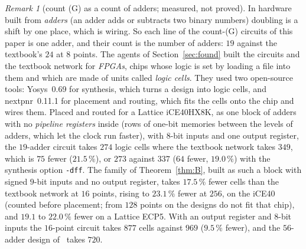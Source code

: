 \documentclass[10pt]{article}
\theoremstyle{remark}
\newtheorem{remark}[proposition]{Remark}
\newcommand{\cntG}{\textup{(G)}}
\begin{document}
\begin{remark}[count \cntG{} as a count of adders; measured, not proved]\label{rem:hardware}
In hardware built from \emph{adders} (an adder adds or subtracts two binary numbers) doubling is a shift by
one place, which is wiring. So each line of the count-\cntG{} circuits of this paper is one adder, and
their count is the number of adders: $19$ against the textbook's $24$ at $8$ points. The agents of
Section~\ref{sec:found} built the circuits and the textbook network for \emph{FPGAs}, chips whose logic is
set by loading a file into them and which are made of units called \emph{logic cells}. They used two
open-source tools: Yosys~0.69 for synthesis, which turns a design into logic cells, and nextpnr~0.11.1 for
placement and routing, which fits the cells onto the chip and wires them. Placed and routed for a Lattice
iCE40HX8K, as one block of adders with no \emph{pipeline registers} inside (rows of one-bit memories
between the levels of adders, which let the clock run faster), with $8$-bit inputs and one output
register, the $19$-adder circuit takes $274$ logic cells where the textbook network takes $349$, which is
$75$ fewer ($21.5\,\%$), or $273$ against $337$ ($64$ fewer, $19.0\,\%$) with the synthesis option
\texttt{-dff}. The
family of Theorem~\ref{thm:B}, built as such a block with signed $9$-bit inputs and no output register,
takes $17.5\,\%$ fewer cells than the textbook network at $16$ points, rising to $23.1\,\%$ fewer at $256$,
on the iCE40 (counted before placement; from $128$ points on the designs do not fit that chip), and
$19.1$ to $22.0\,\%$ fewer on a Lattice ECP5. With an output register and $8$-bit inputs the $16$-point
circuit takes $877$ cells against $969$ ($9.5\,\%$ fewer), and the $56$-adder design of~\cite{CFL} takes
$720$.


\end{remark}
\end{document}
